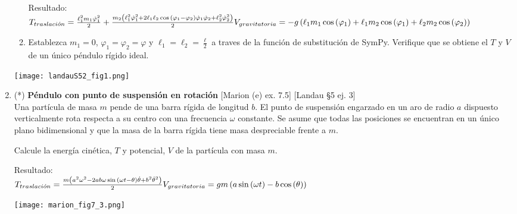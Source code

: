 \documentclass[11pt, spanish, a4paper, twoside]{article}
\begin{document}
\begin{enumerate}
\begin{minipage}[t][6cm]{0.7\textwidth}
\begin{enumerate}
			Resultado:\\
			\(
				T_{traslaci\acute{o}n} = \frac{\ell_{1}^{2} m_{1} \dot{\varphi}_{1}^{2}}{2} + \frac{m_{2} \left(\ell_{1}^{2} \dot{\varphi}_{1}^{2} + 2 \ell_{1} \ell_{2} \cos{\left(\varphi_{1} - \varphi_{2} \right)} \dot{\varphi}_{1} \dot{\varphi}_{2} + \ell_{2}^{2} \dot{\varphi}_{2}^{2}\right)}{2}\\
				V_{gravitatoria} = - g \left(\ell_{1} m_{1} \cos{\left(\varphi_{1} \right)} + \ell_{1} m_{2} \cos{\left(\varphi_{1} \right)} + \ell_{2} m_{2} \cos{\left(\varphi_{2} \right)}\right)
			\)
			\item Establezca \(m_1 = 0\), \(\varphi_1 = \varphi_2 = \varphi\) y \(\ell_1 = \ell_2 = \frac{\ell}{2}\) a traves de la función de substitución de SymPy. Verifique que se obtiene el \(T\) y \(V\) de un único péndulo rígido ideal.
		\end{enumerate}
	\end{minipage}
	\begin{minipage}[c][0.5cm][t]{0.3\textwidth}
		\texttt{[image: landauS52\_fig1.png]}
	\end{minipage}



\item
	\begin{minipage}[t][7.1cm]{0.55\textwidth}
		(*) \textbf{Péndulo con punto de suspensión en rotación} [Marion (e) ex. 7.5] [Landau \S5 ej. 3]\\

		Una partícula de masa \(m\) pende de una barra rígida de longitud \(b\).
		El punto de suspensión engarzado en un aro de radio \(a\) dispuesto verticalmente rota respecta a su centro con una frecuencia \(\omega\) constante.
		Se asume que todas las posiciones se encuentran en un único plano bidimensional y que la masa de la barra rígida tiene masa despreciable frente a \(m\).

		Calcule la energía cinética, \(T\) y potencial, \(V\) de la partícula con masa \(m\).

		Resultado:\\
		\(
			T_{traslaci\acute{o}n} = \frac{m \left(a^{2} \omega^{2} - 2 a b \omega \sin{\left(\omega t - \theta \right)} \dot{\theta} + b^{2} \dot{\theta}^{2}\right)}{2}\\
			V_{gravitatoria} = g m \left(a \sin{\left(\omega t \right)} - b \cos{\left(\theta \right)}\right)
		\)
	\end{minipage}
	\begin{minipage}[c][3cm][t]{0.5\textwidth}
		\texttt{[image: marion\_fig7\_3.png]}
	\end{minipage}




\end{enumerate}
\end{document}
